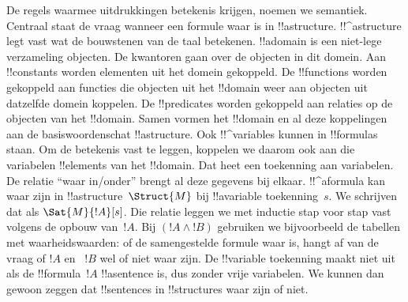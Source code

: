 \documentclass[openany]{memoir}
\begin{document}
\begingroup
\def\olfilename{OLP-0159}
\def\olfilepath{content/first-order-logic/syntax-and-semantics/}
\hypertarget{unit-OLP-0159}{}



\endgroup

\begingroup
\def\olfilename{OLP-0160}
\def\olfilepath{content/first-order-logic/syntax-and-semantics/}
\hypertarget{unit-OLP-0160}{}





De regels waarmee uitdrukkingen betekenis krijgen, noemen we
semantiek. Centraal staat de vraag wanneer een formule waar is in
!!a{structure}. !!^a{structure} legt vast wat de bouwstenen van de taal
betekenen. !!a{domain} is een niet-lege verzameling objecten. De
kwantoren gaan over de objecten in dit domein. Aan !!{constant}s worden
elementen uit het domein gekoppeld. De !!{function}s worden gekoppeld
aan functies die objecten uit het !!{domain} weer aan objecten uit
datzelfde domein koppelen. De !!{predicate}s worden gekoppeld aan
relaties op de objecten van het !!{domain}. Samen vormen het
!!{domain} en al deze koppelingen aan de basiswoordenschat
!!a{structure}. Ook !!^{variable}s kunnen in !!{formula}s staan. Om de
betekenis vast te leggen, koppelen we daarom ook aan die variabelen
!!{element}s van het !!{domain}. Dat heet een toekenning aan
variabelen. De relatie ``waar in/onder'' brengt al deze gegevens bij
elkaar. !!^a{formula} kan waar zijn in !!a{structure}~$\Struct{M}$ bij
!!a{variable} toekenning~$s$. We schrijven dat als
$\Sat{M}{!A}[s]$. Die relatie leggen we met inductie stap voor stap
vast volgens de opbouw van~$!A$. Bij $(!A \land !B)$ gebruiken we
bijvoorbeeld de tabellen met waarheidswaarden: of de samengestelde
formule waar is, hangt af van de vraag of $!A$ en ~$!B$ wel of niet
waar zijn. De !!{variable} toekenning maakt niet uit als de
!!{formula}~$!A$ !!a{sentence} is, dus zonder vrije variabelen. We
kunnen dan gewoon zeggen dat !!{sentence}s in !!{structure}s waar zijn
of niet.
\end{document}

